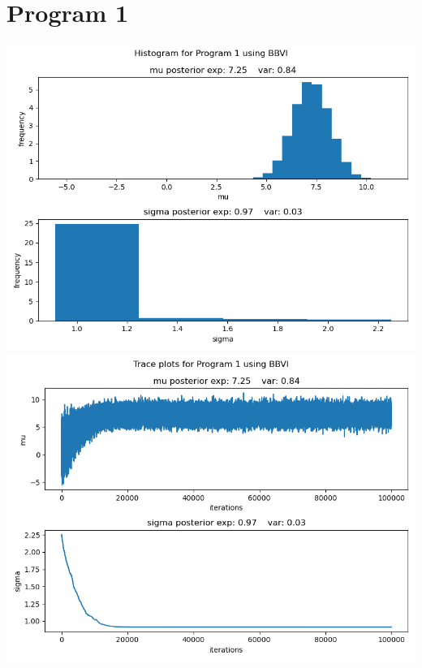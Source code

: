 \documentclass[10pt]{homeworg}
\begin{document}
\section{Program 1}
\begin{center}
\includegraphics[scale=0.5]{figures/BBVI_program_1.png}
\includegraphics[scale=0.5]{figures/BBVI_program_1_trace.png}
\end{center}
\end{document}

